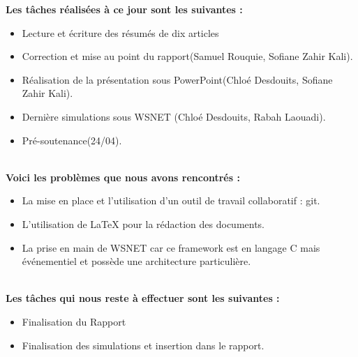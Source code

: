 \documentclass[a4paper]{article}
\begin{document}
{\bfseries Les tâches réalisées à ce jour sont les suivantes :}\\
\begin{itemize}\addtolength{\itemsep}{0.2cm}
\renewcommand\labelitemi{\textbullet}
	\item Lecture et écriture des résumés de dix articles
	\item Correction et mise au point du rapport(Samuel Rouquie, Sofiane Zahir Kali).
	\item Réalisation de la présentation sous PowerPoint(Chloé Desdouits, Sofiane Zahir Kali).
	\item Dernière simulations sous WSNET (Chloé Desdouits, Rabah Laouadi).
	\item Pré-soutenance(24/04).
	
\end{itemize}
~\\
{\bfseries Voici les problèmes que nous avons rencontrés :}\\
\begin{itemize}\addtolength{\itemsep}{0.3cm}
\renewcommand\labelitemi{\textbullet}
	\item La mise en place et l'utilisation d'un outil de travail collaboratif : git.
	\item L'utilisation de \LaTeX{} pour la rédaction des documents.
	\item La prise en main de WSNET car ce framework est en langage C mais événementiel et possède une architecture particulière.

\end{itemize}
~\\
{\bfseries Les tâches qui nous reste à effectuer sont les suivantes :}\\
\begin{itemize}\addtolength{\itemsep}{0.2cm}
\renewcommand\labelitemi{\textbullet}
	\item Finalisation du Rapport
	\item Finalisation des simulations et insertion dans le rapport.
\end{itemize}



\end{document}
